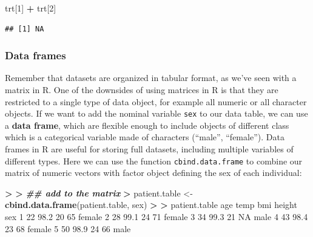 \documentclass[
]{book}
\newenvironment{Shaded}{\begin{snugshade}}{\end{snugshade}}
\newcommand{\ConstantTok}[1]{\textcolor[rgb]{0.56,0.35,0.01}{#1}}
\newcommand{\DecValTok}[1]{\textcolor[rgb]{0.00,0.00,0.81}{#1}}
\newcommand{\DocumentationTok}[1]{\textcolor[rgb]{0.56,0.35,0.01}{\textbf{\textit{#1}}}}
\newcommand{\ErrorTok}[1]{\textcolor[rgb]{0.64,0.00,0.00}{\textbf{#1}}}
\newcommand{\FloatTok}[1]{\textcolor[rgb]{0.00,0.00,0.81}{#1}}
\newcommand{\FunctionTok}[1]{\textcolor[rgb]{0.13,0.29,0.53}{\textbf{#1}}}
\newcommand{\NormalTok}[1]{#1}
\newcommand{\OtherTok}[1]{\textcolor[rgb]{0.56,0.35,0.01}{#1}}
\newcommand{\SpecialCharTok}[1]{\textcolor[rgb]{0.81,0.36,0.00}{\textbf{#1}}}
\begin{document}
\begin{Shaded}
\begin{Highlighting}[]
\NormalTok{trt[}\DecValTok{1}\NormalTok{] }\SpecialCharTok{+}\NormalTok{ trt[}\DecValTok{2}\NormalTok{]}
\end{Highlighting}
\end{Shaded}

\begin{verbatim}
## [1] NA
\end{verbatim}

\subsubsection{Data frames}\label{data-frames}

Remember that datasets are organized in tabular format, as we've seen with a matrix in R. One of the downsides of using matrices in R is that they are restricted to a single type of data object, for example all numeric or all character objects. If we want to add the nominal variable \texttt{sex} to our data table, we can use a \textbf{data frame}, which are flexible enough to include objects of different class which is a categorical variable made of characters (``male'', ``female''). Data frames in R are useful for storing full datasets, including multiple variables of different types. Here we can use the function \texttt{cbind.data.frame} to combine our matrix of numeric vectors with factor object defining the sex of each individual:

\begin{Shaded}
\begin{Highlighting}[]
\SpecialCharTok{\textgreater{}} 
\ErrorTok{\textgreater{}} \DocumentationTok{\#\# add to the matrix}
\ErrorTok{\textgreater{}}\NormalTok{ patient.table }\OtherTok{\textless{}{-}} \FunctionTok{cbind.data.frame}\NormalTok{(patient.table, sex)}
\SpecialCharTok{\textgreater{}} 
\ErrorTok{\textgreater{}}\NormalTok{ patient.table}
\NormalTok{  age temp bmi height    sex}
\DecValTok{1}  \DecValTok{22} \FloatTok{98.2}  \DecValTok{20}     \DecValTok{65}\NormalTok{ female}
\DecValTok{2}  \DecValTok{28} \FloatTok{99.1}  \DecValTok{24}     \DecValTok{71}\NormalTok{ female}
\DecValTok{3}  \DecValTok{34} \FloatTok{99.3}  \DecValTok{21}     \ConstantTok{NA}\NormalTok{   male}
\DecValTok{4}  \DecValTok{43} \FloatTok{98.4}  \DecValTok{23}     \DecValTok{68}\NormalTok{ female}
\DecValTok{5}  \DecValTok{50} \FloatTok{98.9}  \DecValTok{24}     \DecValTok{66}\NormalTok{   male}
\end{Highlighting}
\end{Shaded}
\end{document}
